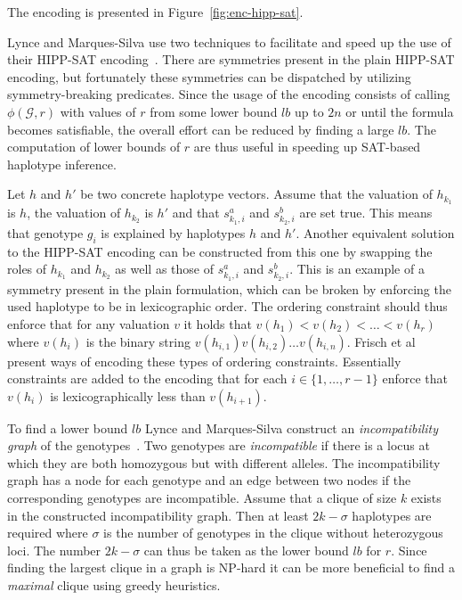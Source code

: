 \documentclass[12pt,a4paper]{article}
\begin{document}
The encoding is presented in Figure~\ref{fig:enc-hipp-sat}.


Lynce and Marques-Silva use two techniques to facilitate and speed up the use of their HIPP-SAT encoding~\cite{DBLP:conf/aaai/LynceM06}.
There are symmetries present in the plain HIPP-SAT encoding, but fortunately these symmetries can be dispatched by utilizing symmetry-breaking predicates.
Since the usage of the encoding consists of calling $\phi (\mathcal{G}, r)$ with values of $r$ from some lower bound $lb$ up to $2n$ or until the formula becomes satisfiable, the overall effort can be reduced by finding a large $lb$.
The computation of lower bounds of $r$ are thus useful in speeding up SAT-based haplotype inference.

Let $h$ and $h'$ be two concrete haplotype vectors.
Assume that the valuation of $h_{k_1}$ is $h$, the valuation of $h_{k_2}$ is $h'$ and that $s_{k_1, i}^a$ and  $s_{k_2, i}^b$ are set true.
This means that genotype $g_i$ is explained by haplotypes $h$ and $h'$.
Another equivalent solution to the HIPP-SAT encoding can be constructed from this one by swapping the roles of $h_{k_1}$ and $h_{k_2}$ as well as those of $s_{k_1, i}^a$ and  $s_{k_2, i}^b$.
This is an example of a symmetry present in the plain formulation, 
which can be broken by enforcing the used haplotype to be in lexicographic order.
The ordering constraint should thus enforce that for any valuation $v$ it holds that $v(h_1) < v(h_2) < \dots < v(h_r)$ where $v(h_i)$ is the binary string $v(h_{i,1})v(h_{i,2})\dots v(h_{i,n})$.
Frisch et al~\cite{DBLP:conf/cp/FrischHKMW02} present ways of encoding these types of ordering constraints.
Essentially constraints are added to the encoding that for each $i\in\{1,\dots ,r-1\}$ enforce that $v(h_i)$ is lexicographically less than $v(h_{i+1})$.

To find a lower bound $lb$ Lynce and Marques-Silva construct an \emph{incompatibility graph} of the genotypes~\cite{DBLP:conf/aaai/LynceM06}.
Two genotypes are \emph{incompatible} if there is a locus at which they are both homozygous but with different alleles.
The incompatibility graph has a node for each genotype and an edge between two nodes if the corresponding genotypes are incompatible.
Assume that a clique of size $k$ exists in the constructed incompatibility graph.
Then at least $2k - \sigma$ haplotypes are required where $\sigma$ is the number of genotypes in the clique without heterozygous loci.
The number $2k-\sigma$ can thus be taken as the lower bound $lb$ for $r$.
Since finding the largest clique in a graph is NP-hard it can be more beneficial to find a \emph{maximal} clique using greedy heuristics.
\end{document}
